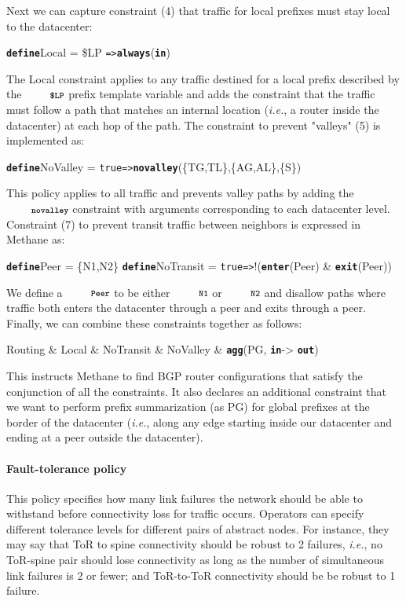 \documentclass[numbers, 10pt, preprint]{sigplanconf}
\newcommand{\IE}{\emph{i.e.}}
\newcommand{\sysname}{{\small \sf Methane}\xspace}
\newcommand{\para}[1]{\paragraph*{\textbf{#1}}}
\newcommand{\CD}[1]{\texttt{\small #1}}  %
\newcommand{\KW}[1]{\texttt{\small\bfseries{#1}}}
\newcommand{\True}{\CD{true}}
\newcommand{\Define}{\KW{define}}
\newcommand{\Path}{\texttt{=>}}
\newcommand{\Agg}{\KW{agg}}
\newcommand{\In}{\KW{in}}
\newcommand{\Out}{\KW{out}}
\newcommand{\Exit}{\KW{exit}}
\newcommand{\Enter}{\KW{enter}}
\newcommand{\Always}{\KW{always}}
\newcommand{\Novalley}{\KW{novalley}}
\begin{document}
Next we can capture constraint (4) that traffic for local prefixes must stay local to the datacenter:
%
\begin{code}
\Define Local =
    \$LP \Path \Always(\In)
\end{code}
\noindent%
%
The Local constraint applies to any traffic destined for a local prefix described by the $\CD{\$LP}$ prefix template variable and adds the constraint that the traffic must follow a path that matches an internal location (\IE, a router inside the datacenter) at each hop of the path.
%
The constraint to prevent "valleys" (5) is implemented as:
%
\begin{code}
\Define NoValley =
    \True \Path \Novalley(\{TG,TL\},\{AG,AL\},\{S\})
\end{code}
\noindent%
%
This policy applies to all traffic and prevents valley paths by adding the $\Novalley$ constraint with arguments corresponding to each datacenter level.
%
Constraint (7) to prevent transit traffic between neighbors is expressed in \sysname as:
%
\begin{code}
\Define Peer = \{N1,N2\}
\Define NoTransit =
    \True \Path !(\Enter(Peer) & \Exit(Peer))
\end{code}
\noindent%
%
We define a $\CD{Peer}$ to be either $\CD{N1}$ or $\CD{N2}$ and disallow paths where traffic both enters the datacenter through a peer and exits through a peer. Finally, we can combine these constraints together as follows:

\begin{code}
Routing & Local & NoTransit & 
NoValley & \Agg(PG, \In -> \Out)
\end{code}
\noindent%

This instructs \sysname to find BGP router configurations that satisfy the conjunction of all the constraints. It also declares an additional constraint that we want to perform prefix summarization (as PG) for global prefixes at the border of the datacenter (\IE, along any edge starting inside our datacenter and ending at a peer outside the datacenter).

\para{Fault-tolerance policy} This policy specifies how many link failures the network should be able to withstand before connectivity loss for traffic occurs. Operators can  specify different tolerance levels for different pairs of abstract nodes. For instance, they may say that ToR to spine connectivity should be robust to 2 failures, \IE, no ToR-spine pair should lose connectivity as long as the number of simultaneous link failures is 2 or fewer; and ToR-to-ToR connectivity should be be robust to 1 failure.
\end{document}
